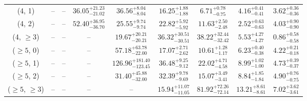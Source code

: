 \begin{table}[h!]
{\begin{tabular}{ccccccccc}
	(4, 1) & -- & -- & $36.05^{+ 21.23 }_{- 21.02 }$ & $36.56^{+ 8.04 }_{- 8.04 }$ & $16.25^{+ 1.88 }_{- 1.88 }$ & $6.71^{+ 0.78 }_{- 0.75 }$ & $4.16^{+ 0.41 }_{- 0.41 }$ & $3.62^{+ 0.36 }_{- 0.36 }$ \\[0.5ex] 
	(4, 2) & -- & -- & $52.40^{+ 36.95 }_{- 36.70 }$ & $25.55^{+ 9.74 }_{- 9.74 }$ & $22.82^{+ 5.92 }_{- 5.92 }$ & $11.63^{+ 2.50 }_{- 2.48 }$ & $2.52^{+ 0.63 }_{- 0.63 }$ & $4.03^{+ 0.90 }_{- 0.90 }$ \\[0.5ex] 
	(4, $\ge3$) & -- & -- & -- & $19.67^{+ 20.21 }_{- 20.21 }$ & $36.32^{+ 30.51 }_{- 30.51 }$ & $38.22^{+ 32.44 }_{- 32.42 }$ & $5.53^{+ 4.27 }_{- 4.27 }$ & $0.86^{+ 0.58 }_{- 0.58 }$ \\[0.5ex] 
	($\ge5$, 0) & -- & -- & -- & $57.18^{+ 63.78 }_{- 22.00 }$ & $17.07^{+ 2.71 }_{- 2.62 }$ & $10.61^{+ 1.28 }_{- 1.17 }$ & $6.23^{+ 0.40 }_{- 0.38 }$ & $4.22^{+ 0.21 }_{- 0.18 }$ \\[0.5ex] 
	($\ge5$, 1) & -- & -- & -- & $126.96^{+ 181.40 }_{- 123.45 }$ & $36.48^{+ 9.25 }_{- 9.12 }$ & $22.02^{+ 4.71 }_{- 4.58 }$ & $8.99^{+ 1.02 }_{- 1.00 }$ & $4.73^{+ 0.39 }_{- 0.37 }$ \\[0.5ex] 
	($\ge5$, 2) & -- & -- & -- & $31.40^{+ 45.88 }_{- 32.00 }$ & $32.39^{+ 9.78 }_{- 9.69 }$ & $15.07^{+ 3.49 }_{- 3.41 }$ & $8.84^{+ 1.85 }_{- 1.84 }$ & $4.90^{+ 0.76 }_{- 0.75 }$ \\[0.5ex] 
	($\ge5$, $\ge3$) & -- & -- & -- & -- & $15.94^{+ 11.07 }_{- 11.05 }$ & $81.92^{+ 72.26 }_{- 72.14 }$ & $13.21^{+ 8.61 }_{- 8.61 }$ & $7.02^{+ 3.62 }_{- 3.61 }$ \\[0.5ex] 
	\hline
	\hline
\end{tabular}}
\end{table}
